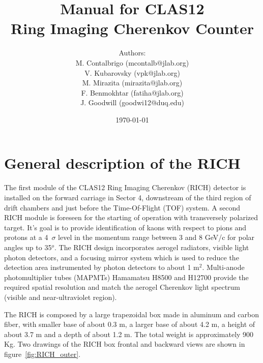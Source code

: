 \documentclass[12pt]{article}
\title{Manual for CLAS12 \\ Ring Imaging Cherenkov Counter}
\author{
Authors: \\
M. Contalbrigo (mcontalb@jlab.org) \\
V. Kubarovsky (vpk@jlab.org)\\
M. Mirazita (mirazita@jlab.org)\\
F. Benmokhtar (fatiha@jlab.org)\\
J. Goodwill (goodwi12@duq.edu)
}
\date{\today} %
\begin{document}
\maketitle{}

\tableofcontents

\newpage
   \section{General description of the RICH}

The first module of the CLAS12 Ring Imaging Cherenkov (RICH) detector is installed on the forward carriage in Sector 4, downstream of the third region of drift chambers and just before the Time-Of-Flight (TOF) system.
A second RICH module is foreseen for the starting of operation with transversely polarized target.
It's goal is to provide identification of kaons with respect to pions and protons at a 4~$\sigma$ level in the momentum range between 3 and 8 GeV/c for polar angles up to 35$^o$.
The RICH design incorporates aerogel radiators, visible light photon detectors, and a focusing mirror system which is used to reduce the detection area instrumented by photon detectors to about 1 m$^2$. 
Multi-anode photomultiplier tubes (MAPMTs) Hamamatsu H8500 and H12700 provide the required spatial resolution and match the aerogel Cherenkov light spectrum (visible and near-ultraviolet region). 

The RICH is composed by a large trapezoidal box made in aluminum and carbon fiber, with smaller base of about 0.3 m, a larger base of about 4.2 m, a height of about 3.7 m and a depth of about 1.2 m. 
The total weight is approximately 900 Kg. 
Two drawings of the RICH box frontal and backward views are shown in figure~\ref{fig:RICH_outer}. 
\end{document}
